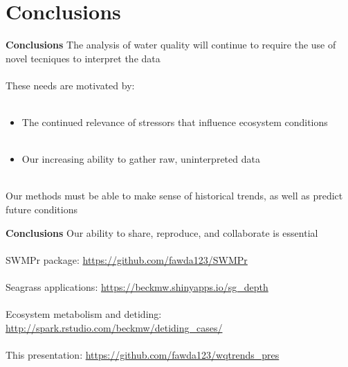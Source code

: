 \documentclass[serif]{beamer}\usepackage[]{graphicx}\usepackage[]{color}
\begin{document}
\section{Conclusions}
\begin{frame}{\textbf{Conclusions}}
The analysis of water quality will continue to require the use of novel tecniques to interpret the data \\~\\
These needs are motivated by: \\~\\
\begin{itemize}
\item The continued relevance of stressors that influence ecosystem conditions \\~\\
\item Our increasing ability to gather raw, uninterpreted data \\~\\
\end{itemize}
Our methods must be able to make sense of \alert{historical trends}, as well as predict \alert{future conditions}
\end{frame}

\begin{frame}{\textbf{Conclusions}}
Our ability to \alert{share}, \alert{reproduce}, and \alert{collaborate} is essential \\~\\
\alert{SWMPr package:} \href{https://github.com/fawda123/SWMPr}{https://github.com/fawda123/SWMPr} \\~\\
\alert{Seagrass applications:} \href{https://beckmw.shinyapps.io/sg_depth}{https://beckmw.shinyapps.io/sg\_depth} \\~\\
\alert{Ecosystem metabolism and detiding:} \href{http://spark.rstudio.com/beckmw/detiding_cases/}{http://spark.rstudio.com/beckmw/detiding\_cases/} \\~\\
\alert{This presentation:} \href{https://github.com/fawda123/wqtrends_pres}{https://github.com/fawda123/wqtrends\_pres}
\end{frame}
\end{document}
